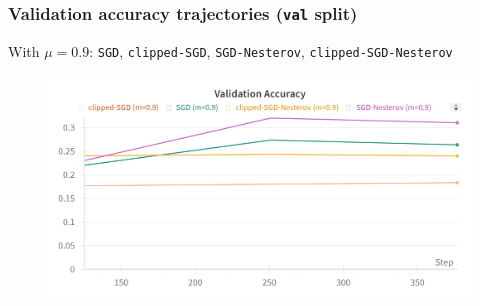 \begin{frame}
    \frametitle{Validation accuracy trajectories (\texttt{val} split)}
    With \(\mu=0.9\): \texttt{SGD}, \texttt{clipped-SGD}, \texttt{SGD-Nesterov}, \texttt{clipped-SGD-Nesterov}
    \begin{figure}[htpb]
        \begin{center}
            \includegraphics[width=\linewidth]
                {pics/experiments/val_accuracy_bad}
        \end{center}
    \end{figure}
\end{frame}
